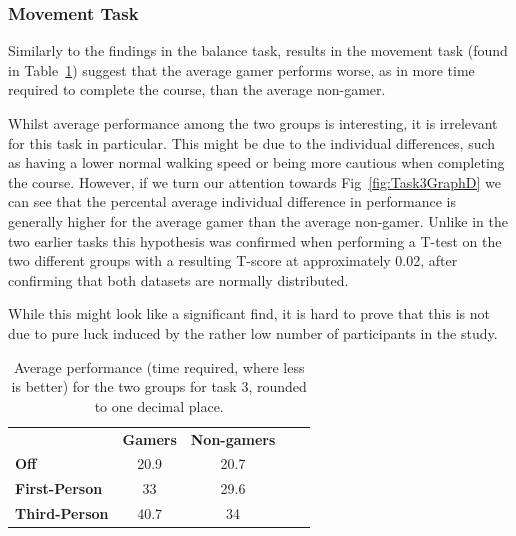 \documentclass[runningheads,a4paper,oribibl]{llncs}
\begin{document}
\subsubsection{Movement Task}
Similarly to the findings in the balance task, results in the movement task (found in Table~\ref{tab:Task3GraphP}) suggest that the average gamer performs worse, as in more time required to complete the course, than the average non-gamer. 

Whilst average performance among the two groups is interesting, it is irrelevant for this task in particular. This might be due to the individual differences, such as having a lower normal walking speed or being more cautious when completing the course. However, if we turn our attention towards Fig~\ref{fig:Task3GraphD} we can see that the percental average individual difference in performance is generally higher for the average gamer than the average non-gamer. Unlike in the two earlier tasks this hypothesis was confirmed when performing a T-test on the two different groups with a resulting T-score at approximately 0.02, after confirming that both datasets are normally distributed.

While this might look like a significant find, it is hard to prove that this is not due to pure luck induced by the rather low number of participants in the study.





\begin{table}[]
\centering
\label{tab:Task3GraphP}
\setlength{\tabcolsep}{1em}
\def\arraystretch{1.8}
\begin{tabular}{l|c|cll}
                      & {\textbf{Gamers}} & {\textbf{Non-gamers}} &  &  \\ \cline{1-3}
\textbf{Off}          & 20.9                                    & 20.7                                          &  &  \\ \cline{1-3}
\textbf{First-Person} & 33                                   & 29.6                                        &  &  \\ \cline{1-3}
\textbf{Third-Person} & 40.7                                    & 34                                        &  & 
\end{tabular}
\caption{Average performance (time required, where less is better) for the two groups for task 3, rounded to one decimal place.}
\end{table}


\end{document}

